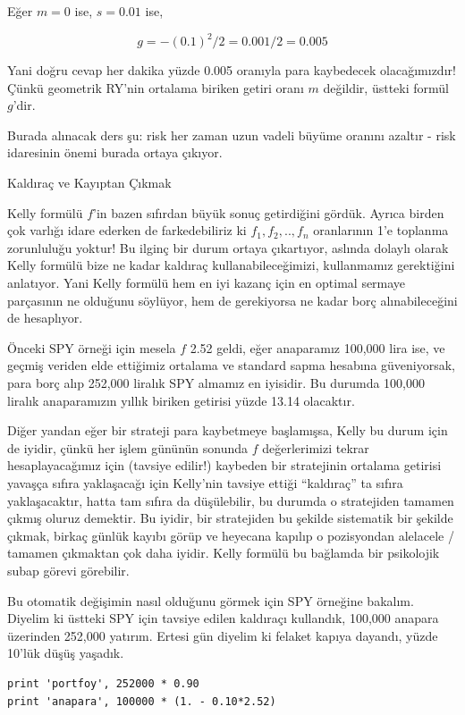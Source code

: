 \documentclass[12pt,fleqn]{article}\usepackage{../../common}
\begin{document}
Eğer $m=0$ ise, $s=0.01$ ise, 

$$ g = -(0.1)^2/2 = 0.001/2 = 0.005 $$

Yani doğru cevap her dakika yüzde 0.005 oranıyla para kaybedecek
olacağımızdır! Çünkü geometrik RY'nin ortalama biriken getiri oranı $m$
değildir, üstteki formül $g$'dir. 

Burada alınacak ders şu: risk her zaman uzun vadeli büyüme oranını
azaltır - risk idaresinin önemi burada ortaya çıkıyor. 

Kaldıraç ve Kayıptan Çıkmak

Kelly formülü $f$'in bazen sıfırdan büyük sonuç getirdiğini gördük. Ayrıca
birden çok varlığı idare ederken de farkedebiliriz ki $f_1,f_2,..,f_n$
oranlarının 1'e toplanma zorunluluğu yoktur! Bu ilginç bir durum ortaya
çıkartıyor, aslında dolaylı olarak Kelly formülü bize ne kadar kaldıraç
kullanabileceğimizi, kullanmamız gerektiğini anlatıyor. Yani Kelly formülü
hem en iyi kazanç için en optimal sermaye parçasının ne olduğunu söylüyor,
hem de gerekiyorsa ne kadar borç alınabileceğini de hesaplıyor.

Önceki SPY örneği için mesela $f$ 2.52 geldi, eğer anaparamız 100,000 lira
ise, ve geçmiş veriden elde ettiğimiz ortalama ve standard sapma hesabına
güveniyorsak, para borç alıp 252,000 liralık SPY almamız en iyisidir. Bu
durumda 100,000 liralık anaparamızın yıllık biriken getirisi yüzde 13.14
olacaktır.

Diğer yandan eğer bir strateji para kaybetmeye başlamışsa, Kelly bu durum
için de iyidir, çünkü her işlem gününün sonunda $f$ değerlerimizi tekrar
hesaplayacağımız için (tavsiye edilir!) kaybeden bir stratejinin ortalama
getirisi yavaşça sıfıra yaklaşacağı için Kelly'nin tavsiye ettiği
``kaldıraç'' ta sıfıra yaklaşacaktır, hatta tam sıfıra da düşülebilir, bu
durumda o stratejiden tamamen çıkmış oluruz demektir. Bu iyidir, bir
stratejiden bu şekilde sistematik bir şekilde çıkmak, birkaç günlük kayıbı
görüp ve heyecana kapılıp o pozisyondan alelacele / tamamen çıkmaktan çok
daha iyidir. Kelly formülü bu bağlamda bir psikolojik subap görevi
görebilir. 

Bu otomatik değişimin nasıl olduğunu görmek için SPY örneğine
bakalım. Diyelim ki üstteki SPY için tavsiye edilen kaldıraçı kullandık,
100,000 anapara üzerinden 252,000 yatırım. Ertesi gün diyelim ki felaket
kapıya dayandı, yüzde 10'lük düşüş yaşadık. 

\begin{verbatim}
print 'portfoy', 252000 * 0.90
print 'anapara', 100000 * (1. - 0.10*2.52)
\end{verbatim}
\end{document}
